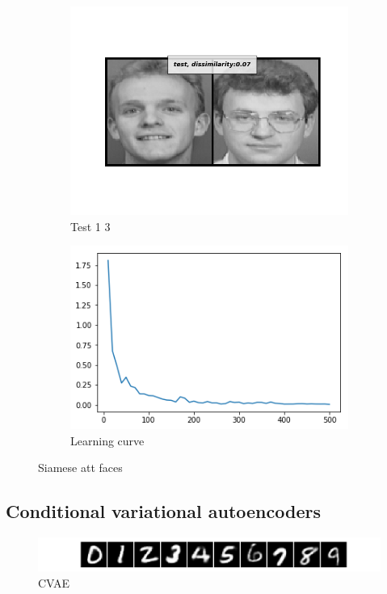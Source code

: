 \documentclass[12pt]{article}
\begin{document}
\begin{figure}[htbp]
\begin{subfigure}[t]{0.48\textwidth}
        \includegraphics[scale=0.5,trim={1in 1in 1in 1in},clip]{./Homework3/output/siamese/test_1_4.png}
        \caption{Test 1 3}
    \label{hw3p3i}
    \end{subfigure}
    \begin{subfigure}[t]{0.48\textwidth}
        \centering
        \includegraphics[scale=0.4]{./Homework3/output/siamese/learning_curve.png}
        \caption{Learning curve}
    \label{hw3p3j}
    \end{subfigure}
    \caption{Siamese att faces}
\end{figure}


\newpage
\subsection{Conditional variational autoencoders}
\begin{figure}[htbp]
    \centering
    \includegraphics[width=\textwidth]{./Homework3/output/cvae/Figure_1.png}
    \caption{CVAE}
    \label{hw3p3}
\end{figure}

\end{document}
